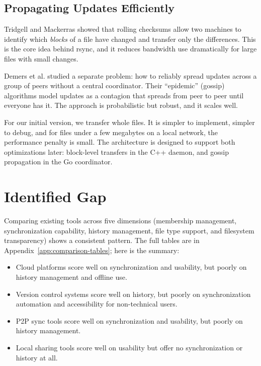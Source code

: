 \subsection{Propagating Updates Efficiently}

Tridgell and Mackerras \citeyear{rsync1996} showed that rolling checksums allow two machines to identify which \emph{blocks} of a file have changed and transfer only the differences. This is the core idea behind rsync, and it reduces bandwidth use dramatically for large files with small changes.

Demers et al. \citeyear{demers1987} studied a separate problem: how to reliably spread updates across a group of peers without a central coordinator. Their ``epidemic'' (gossip) algorithms model updates as a contagion that spreads from peer to peer until everyone has it. The approach is probabilistic but robust, and it scales well.

For our initial version, we transfer whole files. It is simpler to implement, simpler to debug, and for files under a few megabytes on a local network, the performance penalty is small. The architecture is designed to support both optimizations later: block-level transfers in the C++ daemon, and gossip propagation in the Go coordinator.

\section{Identified Gap}

Comparing existing tools across five dimensions (membership management, synchronization capability, history management, file type support, and filesystem transparency) shows a consistent pattern. The full tables are in Appendix~\ref{app:comparison-tables}; here is the summary:

\begin{itemize}
    \item Cloud platforms score well on synchronization and usability, but poorly on history management and offline use.
    \item Version control systems score well on history, but poorly on synchronization automation and accessibility for non-technical users.
    \item P2P sync tools score well on synchronization and usability, but poorly on history management.
    \item Local sharing tools score well on usability but offer no synchronization or history at all.
\end{itemize}

